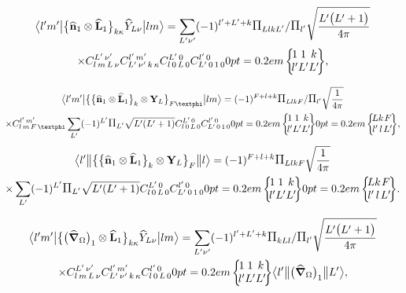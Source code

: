 \begin{multline}
\braOket{ l^{\prime} m^{\prime}}{\bigl\{\widehat{\vect{n}}_{1} \otimes \widehat{\vect{L}}_{1}\bigr\}_{k \kappa} \widehat{Y}_{L \nu}}{l m}=\sum_{L^{\prime} \nu^{\prime}}(-1)^{l^{\prime}+L^{\prime}+k} \Fact{L l k L^{\prime}}/\Fact{l^\prime}\sqrt{\frac{L^{\prime}\bigl(L^{\prime}+1\bigr)}{4 \pi}} \\
 \times 
\clebsch{l}{m}{L}{\nu}{L^{\prime}}{\nu^{\prime}} 
\clebsch{L^{\prime}}{\nu^{\prime}}{k}{\kappa}{l^{\prime}}{m^{\prime}} 
\clebsch{l}{0}{L}{0}{L^{\prime}}{0} 
\clebsch{L^{\prime}}{0}{1}{0}{l^{\prime}}{0}
\sixj{1}{1}{k}{l^{\prime}}{L^{\prime}}{L^{\prime}},  \label{eq:13:2:130}
\end{multline}

\begin{multline} 
\braOket{ l^{\prime} m^{\prime}}{\bigl\{\bigl\{\widehat{\vect{n}}_{1} \otimes \widehat{\vect{L}}_{1}\bigr\}_{k} \otimes \vect{Y}_{L}\bigr\}_{F \varphi}}{l m}
=(-1)^{F+l+k} \Fact{L l k F}/\Fact{l^\prime}\sqrt{\frac{1}{4 \pi}} \\
 \times 
\clebsch{l}{m}{F}{\varphi}{l^{\prime}}{m^{\prime}} 
\sum_{L^{\prime}}(-1)^{L^{\prime}} \Fact{L^\prime}\sqrt{L^{\prime}(L^{\prime}+1)}
\clebsch{l}{0}{L}{0}{L^{\prime}}{0} 
\clebsch{L^{\prime}}{0}{1}{0}{l^{\prime}}{0}
\sixj{1}{1}{k}{l^{\prime}}{L^{\prime}}{L^{\prime}}
\sixj{L}{k}{F}{l^{\prime}}{l}{L^{\prime}},  \label{eq:13:2:131}
\end{multline}
\begin{multline*}
\braOketred{ l^{\prime}}{\bigl\{\bigl\{\widehat{\vect{n}}_{1} \otimes \widehat{\vect{L}}_{1}\bigr\}_{k} \otimes \vect{Y}_{L}\bigr\}_{F}}{ l}
=(-1)^{F+l+k} \Fact{L l k F}\sqrt{\frac{1}{4 \pi}} \\
\times
\sum_{L^{\prime}}(-1)^{L^{\prime}} \Fact{L^\prime}\sqrt{L^{\prime}(L^{\prime}+1)}
\clebsch{l}{0}{L}{0}{L^{\prime}}{0}
\clebsch{L^{\prime}}{0}{1}{0}{l^{\prime}}{0}
\sixj{1}{1}{k}{l^{\prime}}{L^{\prime}}{L^{\prime}}
\sixj{L}{k}{F}{l^{\prime}}{l}{L^{\prime}}.
\end{multline*}

\begin{multline}
\braOket{ l^{\prime} m^{\prime}}{\bigl\{\bigl(\delop_{\Omega}\bigr)_{1} \otimes \widehat{\vect{L}}_{1}\bigr\}_{k \kappa} \widehat{Y}_{L \nu}}{l m}=\sum_{L^{\prime} \nu^{\prime}}(-1)^{l^{\prime}+L^{\prime}+k} \Fact{k L l}/\Fact{l^\prime}\sqrt{\frac{L^{\prime}\bigl(L^{\prime}+1\bigr)}{4 \pi}} \\
 \times 
\clebsch{l}{m}{L}{\nu}{L^{\prime}}{\nu^{\prime}} 
\clebsch{L^{\prime}}{\nu^{\prime}}{k}{\kappa}{l^{\prime}}{m^{\prime}} 
\clebsch{l}{0}{L}{0}{l^{\prime}}{0}
\sixj{1}{1}{k}{l^{\prime}}{L^{\prime}}{L^{\prime}}
\braOketred{ l^{\prime}}{\bigl(\delop_{\Omega}\bigr)_{1}}{ L^{\prime}},  \label{eq:13:2:132}
\end{multline}

